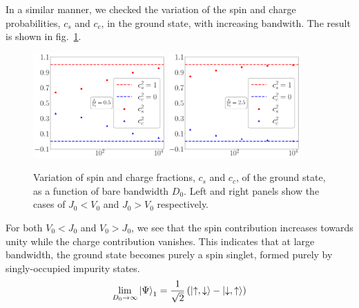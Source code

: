 In a similar manner, we checked the variation of the spin and charge probabilities, \(c_s\) and \(c_c\), in the ground state, with increasing bandwith. The result is shown in fig.~\ref{c_vs_D}.
\begin{figure}[htpb]
	\centering
	\includegraphics[width=0.45\textwidth]{../figures/coeffs_vs_D_largeV.pdf}
	\includegraphics[width=0.45\textwidth]{../figures/coeffs_vs_D_smallV.pdf}
	\caption{Variation of spin and charge fractions, \(c_s\) and \(c_c\), of the ground state, as a function of bare bandwidth \(D_0\). Left and right panels show the cases of \(J_0 < V_0\) and \(J_0 > V_0\) respectively.}
	\label{c_vs_D}
\end{figure}
For both \(V_0 < J_0\) and \(V_0 > J_0\), we see that the spin contribution increases towards unity while the charge contribution vanishes. This indicates that at large bandwidth, the ground state becomes purely a spin singlet, formed purely by singly-occupied impurity states.
\begin{equation}\begin{aligned}
	\label{gstate_kondo}
	\lim_{D_0 \to \infty} \ket{\Psi}_1 = \frac{1}{\sqrt 2}\left(\ket{\uparrow, \downarrow} - \ket{\downarrow, \uparrow}\right) 
\end{aligned}\end{equation}
